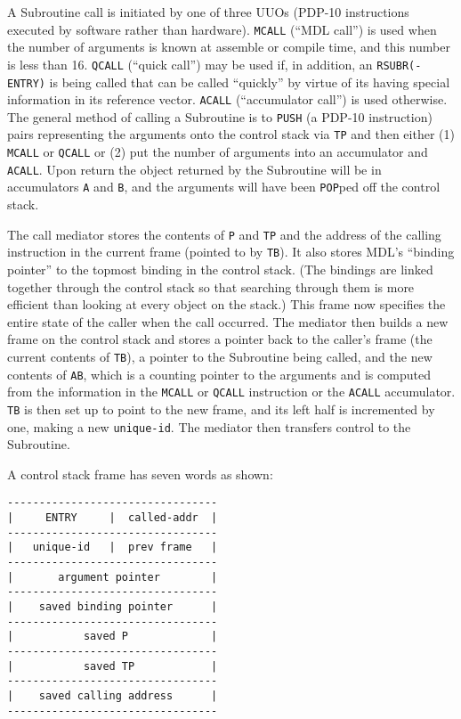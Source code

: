 \documentclass[a4paper,]{article}
\begin{document}
A Subroutine call is initiated by one of three UUOs (PDP-10 instructions executed by software rather than hardware).
\texttt{MCALL} (``MDL call'') is used when the number of arguments is known at assemble or compile time, and this number is
less than 16. \texttt{QCALL} (``quick call'') may be used if, in addition, an \texttt{RSUBR(-ENTRY)} is being called that
can be called ``quickly'' by virtue of its having special information in its reference vector. \texttt{ACALL}
(``accumulator call'') is used otherwise. The general method of calling a Subroutine is to \texttt{PUSH} (a PDP-10
instruction) pairs representing the arguments onto the control stack via \texttt{TP} and then either (1) \texttt{MCALL} or
\texttt{QCALL} or (2) put the number of arguments into an accumulator and \texttt{ACALL}. Upon return the object returned
by the Subroutine will be in accumulators \texttt{A} and \texttt{B}, and the arguments will have been \texttt{POP}ped off
the control stack.

The call mediator stores the contents of \texttt{P} and \texttt{TP} and the address of the calling instruction in the
current frame (pointed to by \texttt{TB}). It also stores MDL's ``binding pointer'' to the topmost binding in the control
stack. (The bindings are linked together through the control stack so that searching through them is more efficient than
looking at every object on the stack.) This frame now specifies the entire state of the caller when the call occurred. The
mediator then builds a new frame on the control stack and stores a pointer back to the caller's frame (the current contents
of \texttt{TB}), a pointer to the Subroutine being called, and the new contents of \texttt{AB}, which is a counting pointer
to the arguments and is computed from the information in the \texttt{MCALL} or \texttt{QCALL} instruction or the
\texttt{ACALL} accumulator. \texttt{TB} is then set up to point to the new frame, and its left half is incremented by one,
making a new \texttt{unique-id}. The mediator then transfers control to the Subroutine.

A control stack frame has seven words as shown:

\begin{verbatim}
---------------------------------
|     ENTRY     |  called-addr  |
---------------------------------
|   unique-id   |  prev frame   |
---------------------------------
|       argument pointer        |
---------------------------------
|    saved binding pointer      |
---------------------------------
|           saved P             |
---------------------------------
|           saved TP            |
---------------------------------
|    saved calling address      |
---------------------------------
\end{verbatim}
\end{document}
